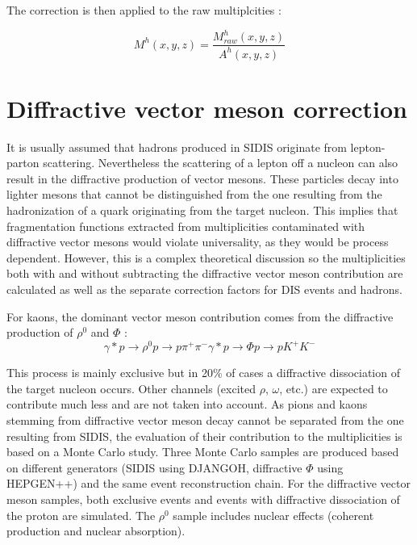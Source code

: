 The correction is then applied to the raw multiplcities :

\begin{equation}
  M^h(x,y,z) = \frac{M^h_{raw}(x,y,z)}{A^h(x,y,z)}
\end{equation}


\section{Diffractive vector meson correction}

It is usually assumed that hadrons produced in SIDIS originate from lepton-parton scattering. Nevertheless the scattering of a lepton
off a nucleon can also result in the diffractive production of vector mesons. These particles decay into lighter mesons that cannot be
distinguished from the one resulting from the hadronization of a quark originating from the target nucleon. This implies that fragmentation
functions extracted from multiplicities contaminated with diffractive vector mesons would violate universality, as they would be process
dependent. However, this is a complex theoretical discussion so the multiplicities both with and without subtracting the diffractive vector
meson contribution are calculated as well as the separate correction factors for DIS events and hadrons.

For kaons, the dominant vector meson contribution comes from the diffractive production of $\rho^0$ and $\Phi$ :
\begin{equation}
    \gamma * p \rightarrow \rho^0 p \rightarrow p\pi^+\pi^-
    \gamma * p \rightarrow \Phi p \rightarrow pK^+K^-
\end{equation}

This process is mainly exclusive but in 20\% of cases a diffractive dissociation of the target nucleon occurs. Other channels (excited $\rho$, $\omega$, etc.)
are expected to contribute much less and are not taken into account. As pions and kaons stemming from diffractive
vector meson decay cannot be separated from the one resulting from SIDIS, the evaluation of their contribution to the multiplicities is based on a
Monte Carlo study. Three Monte Carlo samples are produced based on different generators (SIDIS using DJANGOH, diffractive $\Phi$ using HEPGEN++) and
the same event reconstruction chain. For the diffractive vector meson samples, both exclusive events and events with diffractive dissociation of the
proton are simulated. The $\rho^0$ sample includes nuclear effects (coherent production and nuclear absorption).

